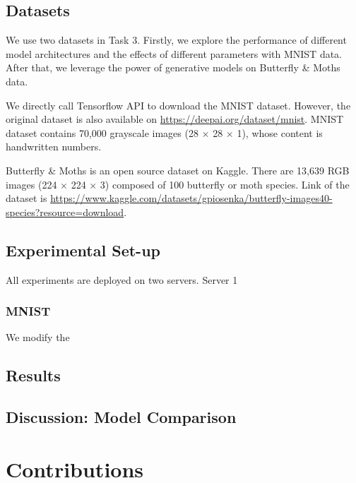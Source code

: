 \documentclass{article}
\begin{document}
\subsection{Datasets}
We use two datasets in Task 3. Firstly, we explore the performance of different model architectures and the effects of different parameters with MNIST data. After that, we leverage the power of generative models on Butterfly \& Moths data. \par
We directly call Tensorflow API to download the MNIST dataset. However, the original dataset is also available on \url{https://deepai.org/dataset/mnist}. MNIST dataset contains 70,000 grayscale images (28 $\times$ 28 $\times$ 1), whose content is handwritten numbers. \par
Butterfly \& Moths is an open source dataset on Kaggle. There are 13,639 RGB images (224 $\times$ 224 $\times$ 3) composed of 100 butterfly or moth species. Link of the dataset is \url{https://www.kaggle.com/datasets/gpiosenka/butterfly-images40-species?resource=download}.

\subsection{Experimental Set-up}
All experiments are deployed on two servers. Server 1
\subsubsection{MNIST}
We modify the 

\subsection{Results}

\subsection{Discussion: Model Comparison}

\section*{Contributions}
\end{document}
